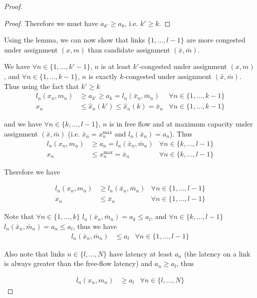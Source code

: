 \begin{proof}
\begin{proof}
Therefore we must have $a_{k'} \geq a_k$, i.e. $k' \geq k$.
\end{proof}


\bigskip
Using the lemma, we can now show that links $\{1, \dots, l-1\}$ are more congested under assignment $(x, m)$ than candidate assignment $(\bar{x}, \bar{m})$.

We have $\forall n \in \{1, \dots, k'-1\}$, $n$ is at least $k'$-congested under assignment $(x, m)$, and $\forall n \in \{1, \dots, k-1\}$, $n$ is exactly $k$-congested under assignment $(\bar{x}, \bar{m})$. Thus using the fact that $k' \geq k$
\begin{align*}
l_n(x_n, m_n) &\geq a_{k'} \geq a_k = l_n(\bar{x}_n, \bar{m}_n) & \forall n \in \{1, \dots, k-1\}\\
x_n &\leq \hat{x}_n(k') \leq \hat{x}_n(k) = \bar{x}_n & \forall n \in \{1, \dots, k-1\}
\end{align*}

and we have $\forall n \in \{ k, \dots, l-1\}$, $n$ is in free flow and at maximum capacity under assignment $(\bar{x}, \bar{m})$ (i.e. $\bar{x}_n = x_n^{\max}$ and $l_n(\bar{x}_n) = a_n$). Thus
\begin{align*}
l_n(x_n, m_n) &\geq a_n = l_n(\bar{x}_n, \bar{m}_n) & \forall n \in \{ k, \dots, l-1\}\\
x_n &\leq x^{\max}_n = \bar{x}_n & \forall n \in \{ k, \dots, l-1\}
\end{align*}

Therefore we have

\begin{align}
\label{eq:cong_latency}
l_n(x_n, m_n) &\geq l_n(\bar{x}_n, \bar{m}_n) & \forall n \in \{ 1, \dots, l-1\}\\
\label{eq:cong_flow}
x_n &\leq \bar{x}_n &\forall n \in \{ 1, \dots, l-1\}
\end{align}

Note that $\forall n \in \{1, \dots, k\}$ $l_n(\bar{x}_n, \bar{m}_n) = a_k \leq a_l$, and $\forall n \in \{k, \dots, l-1\}$ $l_n(\bar{x}_n, \bar{m}_n) = a_n \leq a_l$, thus we have
\begin{align}
\label{eq:cong_latencybar}
l_n(\bar{x}_n, \bar{m}_n) &\leq a_l & \forall n \in \{ 1, \dots, l-1\}
\end{align}


Also note that links $n \in \{ l, \dots, N\}$ have latency at least $a_n$ (the latency on a link is always greater than the free-flow latency) and $a_n \geq a_l$, thus

\begin{align}
\label{eq:ff_latency}
l_n(x_n, m_n) & \geq a_l & \forall n \in \{ l, \dots, N\}
\end{align}



\end{proof}
